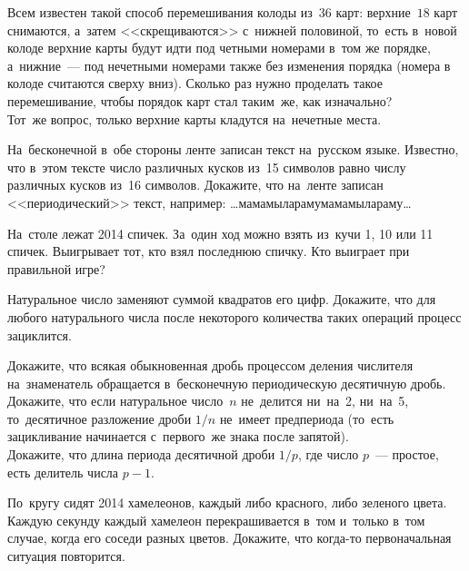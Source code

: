 \begin{problems}

\item
\sp
Всем известен такой способ перемешивания колоды из~$36$ карт: верхние~$18$ карт
снимаются, а~затем <<скрещиваются>> с~нижней половиной, то~есть в~новой колоде
верхние карты будут идти под четными номерами в~том же порядке, а~нижние~---
под нечетными номерами также без изменения порядка
(номера в колоде считаются сверху вниз).
Сколько раз нужно проделать такое перемешивание, чтобы порядок карт стал
таким~же, как изначально?
\\
\sp
Тот~же вопрос, только верхние карты кладутся на~нечетные места.

\item
На~бесконечной в~обе стороны ленте записан текст на~русском языке.
Известно, что в~этом тексте число различных кусков из~15 символов равно числу
различных кусков из~16 символов.
Докажите, что на~ленте записан <<периодический>> текст, например:
\textsf{\ldots{мамамыларамумамамылараму}\ldots}

\item
На~столе лежат 2014 спичек.
За~один ход можно взять из~кучи 1, 10 или 11 спичек.
Выигрывает тот, кто взял последнюю спичку.
Кто выиграет при правильной игре?

\item
Натуральное число заменяют суммой квадратов его цифр.
Докажите, что для любого натурального числа после некоторого количества таких
операций процесс зациклится.

\item
\sp
Докажите, что всякая обыкновенная дробь процессом деления числителя
на~знаменатель обращается в~бесконечную периодическую десятичную дробь.
\\
\sp
Докажите, что если натуральное число~$n$ не~делится ни~на~2, ни~на~5,
то~десятичное разложение дроби $1/n$ не~имеет предпериода
(то~есть зацикливание начинается с~первого~же знака после запятой).
\\
\sp
Докажите, что длина периода десятичной дроби $1 / p$, где число $p$~---
простое, есть делитель числа $p - 1$.

\item
По~кругу сидят 2014 хамелеонов, каждый либо красного, либо зеленого цвета.
Каждую секунду каждый хамелеон перекрашивается в~том и~только в~том случае,
когда его соседи разных цветов.
Докажите, что когда-то первоначальная ситуация повторится.

\end{problems}

